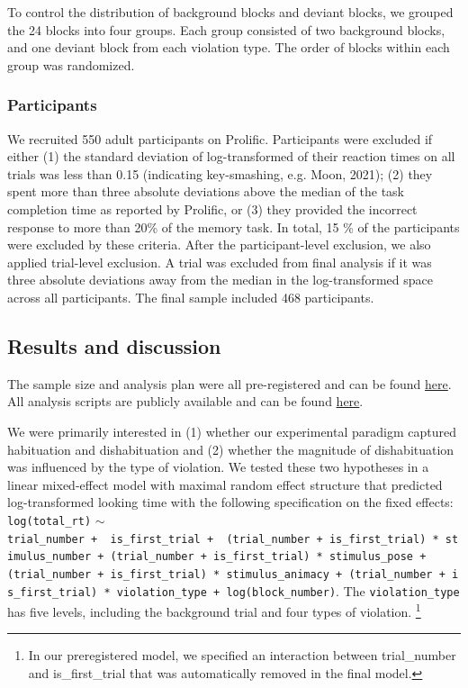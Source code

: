 \documentclass[10pt, letterpaper]{article}
\begin{document}
To control the distribution of background blocks and deviant blocks, we
grouped the 24 blocks into four groups. Each group consisted of two
background blocks, and one deviant block from each violation type. The
order of blocks within each group was randomized.

\hypertarget{participants}{%
\subsubsection{Participants}\label{participants}}

We recruited 550 adult participants on Prolific. Participants were
excluded if either (1) the standard deviation of log-transformed of
their reaction times on all trials was less than 0.15 (indicating
key-smashing, e.g. Moon, 2021); (2) they spent more than three absolute
deviations above the median of the task completion time as reported by
Prolific, or (3) they provided the incorrect response to more than 20\%
of the memory task. In total, 15 \% of the participants were excluded by
these criteria. After the participant-level exclusion, we also applied
trial-level exclusion. A trial was excluded from final analysis if it
was three absolute deviations away from the median in the
log-transformed space across all participants. The final sample included
468 participants.

\hypertarget{results-and-discussion}{%
\subsection{Results and discussion}\label{results-and-discussion}}

The sample size and analysis plan were all pre-registered and can be
found \href{https://aspredicted.org/blind.php?x=WGF_J7K}{here}. All
analysis scripts are publicly available and can be found
\href{https://anonymous.4open.science/r/pokebaby_cogsci2024-3636/README.md}{here}.

We were primarily interested in (1) whether our experimental paradigm
captured habituation and dishabituation and (2) whether the magnitude of
dishabituation was influenced by the type of violation. We tested these
two hypotheses in a linear mixed-effect model with maximal random effect
structure that predicted log-transformed looking time with the following
specification on the fixed effects: \texttt{log(total\_rt)} \(\sim\)
\texttt{trial\_number\ +\ \ is\_first\_trial\ +\ \ (trial\_number\ +\ is\_first\_trial)\ *\ stimulus\_number\ +\ (trial\_number\ +\ is\_first\_trial)\ *\ stimulus\_pose\ +(trial\_number\ +\ is\_first\_trial)\ *\ stimulus\_animacy\ +\ (trial\_number\ +\ is\_first\_trial)\ *\ violation\_type\ +\ log(block\_number)}.
The \texttt{violation\_type} has five levels, including the background
trial and four types of violation. \footnote{In our preregistered model,
  we specified an interaction between trial\_number and is\_first\_trial
  that was automatically removed in the final model.}
\end{document}
